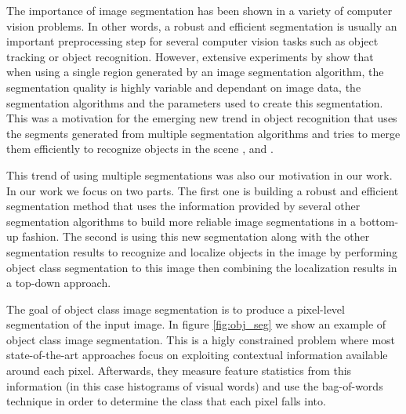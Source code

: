 \documentclass[twoside,11pt]{article}
\begin{document}
The importance of image segmentation has been shown in a variety of computer
vision problems. In other words, a robust and efficient segmentation is usually
an important preprocessing step for several computer vision tasks such as object
tracking or object recognition. However, extensive experiments by
\cite{Unnikrishnan_2007_5789}
show that when using a single region generated by an image segmentation
algorithm, the
segmentation quality is highly variable and dependant on image data, the
segmentation algorithms and the parameters used to create this segmentation.
This was a motivation for the emerging new trend in object
recognition that uses the segments generated from multiple
segmentation algorithms and tries to merge them efficiently to recognize objects
in the scene \cite{Efros_2006_5395}, \cite{PSH08} and \cite{malisiewicz-bmvc07}.

This trend of using multiple segmentations was also our motivation in our work.
In our work we focus on
two parts. The first one is building a robust and efficient
segmentation method that uses the
information provided by several other segmentation algorithms to build
more reliable image segmentations in a bottom-up fashion. The second is
using this new segmentation along with the other segmentation
results to recognize and localize objects in the image by performing object
class segmentation to this image then combining the localization results in
a top-down approach.

The goal of object class image segmentation is to produce
a pixel-level segmentation of the input image. In figure \ref{fig:obj_seg} we
show
an example of object class image segmentation. This is a higly constrained
problem where most state-of-the-art approaches focus on exploiting contextual
information available around each pixel. Afterwards, they measure feature
statistics from this information (in this case histograms of visual words)
and use the bag-of-words technique in order to determine the class that
each pixel falls into.
\end{document}
